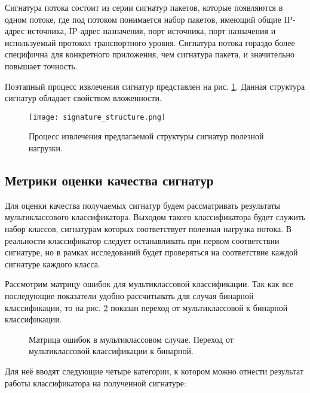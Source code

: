 Сигнатура потока состоит из серии сигнатур пакетов, которые появляются в одном потоке, где под потоком понимается набор пакетов,
имеющий общие IP-адрес источника, IP-адрес назначения, порт источника, порт назначения и
используемый протокол транспортного уровня. Сигнатура потока гораздо более специфична для конкретного приложения,
чем сигнатура пакета, и значительно повышает точность.

Поэтапный процесс извлечения сигнатур представлен на рис. \ref{signature_process}.
Данная структура сигнатур обладает свойством вложенности.

\begin{figure}[H]
    \begin{center}
        \texttt{[image: signature\_structure.png]}
        \caption{Процесс извлечения предлагаемой структуры сигнатур полезной нагрузки.}\label{signature_process}
    \end{center}
\end{figure}

\subsection{Метрики оценки качества сигнатур}

Для оценки качества получаемых сигнатур будем рассматривать результаты мультиклассового классификатора.
Выходом такого классификатора будет служить набор классов, сигнатурам которых соответствует полезная нагрузка потока.
В реальности классификатор следует останавливать при первом соответствии сигнатуре,
но в рамках исследований будет проверяться на соответствие каждой сигнатуре каждого класса.

Рассмотрим матрицу ошибок для мультиклассовой классификации. Так как все последующие показатели удобно рассчитывать
для случая бинарной классификации, то на рис. \ref{ConfusionMatrix} показан переход от мультиклассовой к бинарной классификации.

\begin{figure}[h!]
    \begin{center}
        
        \caption{Матрица ошибок в мультиклассовом случае. Переход от мультиклассовой классификации к бинарной.} \label{ConfusionMatrix}
    \end{center}
\end{figure}

Для неё вводят следующие четыре категории, к котором можно отнести результат работы классификатора на полученной сигнатуре:

